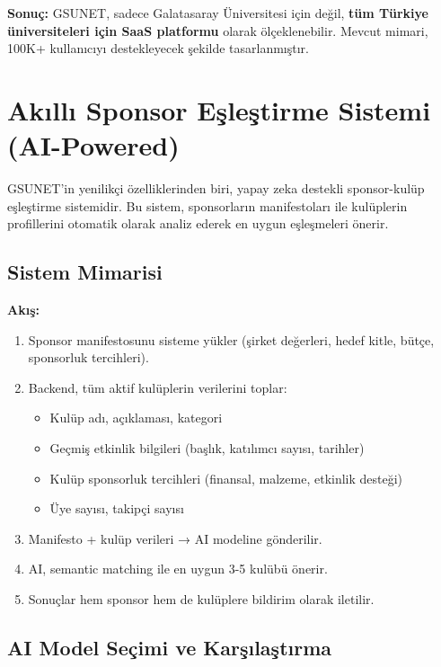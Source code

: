 \documentclass[a4paper,12pt]{report}
\begin{document}
\textbf{Sonuç:} GSUNET, sadece Galatasaray Üniversitesi için değil, \textbf{tüm Türkiye üniversiteleri için SaaS platformu} olarak ölçeklenebilir. Mevcut mimari, 100K+ kullanıcıyı destekleyecek şekilde tasarlanmıştır.

\section{Akıllı Sponsor Eşleştirme Sistemi (AI-Powered)}

GSUNET'in yenilikçi özelliklerinden biri, yapay zeka destekli sponsor-kulüp eşleştirme sistemidir. Bu sistem, sponsorların manifestoları ile kulüplerin profillerini otomatik olarak analiz ederek en uygun eşleşmeleri önerir.

\subsection{Sistem Mimarisi}

\textbf{Akış:}
\begin{enumerate}
    \item Sponsor manifestosunu sisteme yükler (şirket değerleri, hedef kitle, bütçe, sponsorluk tercihleri).
    \item Backend, tüm aktif kulüplerin verilerini toplar:
    \begin{itemize}
        \item Kulüp adı, açıklaması, kategori
        \item Geçmiş etkinlik bilgileri (başlık, katılımcı sayısı, tarihler)
        \item Kulüp sponsorluk tercihleri (finansal, malzeme, etkinlik desteği)
        \item Üye sayısı, takipçi sayısı
    \end{itemize}
    \item Manifesto + kulüp verileri → AI modeline gönderilir.
    \item AI, semantic matching ile en uygun 3-5 kulübü önerir.
    \item Sonuçlar hem sponsor hem de kulüplere bildirim olarak iletilir.
\end{enumerate}

\subsection{AI Model Seçimi ve Karşılaştırma}
\end{document}
